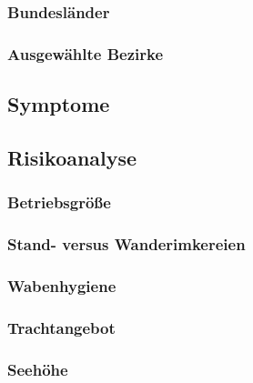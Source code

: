 \blindtext


\blindtext


\subsubsection{Bundesländer}

\blindtext

\subsubsection{Ausgewählte Bezirke}

\blindtext

\subsection{Symptome}

\blindtext

\subsection{Risikoanalyse}

\subsubsection{Betriebsgröße}

\blindtext

\subsubsection{Stand- versus Wanderimkereien}

\blindtext

\subsubsection{Wabenhygiene}

\blindtext

\subsubsection{Trachtangebot}

\blindtext

\subsubsection{Seehöhe}

